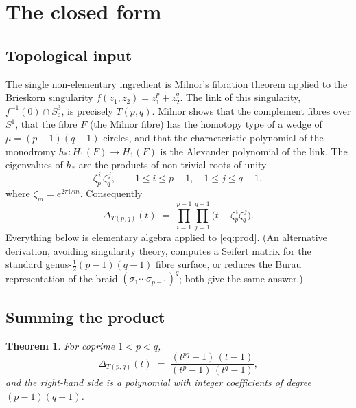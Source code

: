 \documentclass[11pt]{article}
\newtheorem{theorem}{Theorem}
\theoremstyle{definition}
\newcommand{\Deltaa}{\Delta}
\newcommand{\T}[2]{T(#1,#2)}
\begin{document}
\section{The closed form}

\subsection{Topological input}

The single non-elementary ingredient is Milnor's fibration theorem applied to the
Brieskorn singularity $f(z_{1},z_{2}) = z_{1}^{p} + z_{2}^{q}$. The link of this
singularity, $f^{-1}(0)\cap S^{3}_{\varepsilon}$, is precisely $\T{p}{q}$. Milnor
shows that the complement fibres over $S^{1}$, that the fibre $F$ (the Milnor fibre)
has the homotopy type of a wedge of $\mu = (p-1)(q-1)$ circles, and that the
characteristic polynomial of the monodromy $h_{*}\colon H_{1}(F) \to H_{1}(F)$ is the
Alexander polynomial of the link. The eigenvalues of $h_{*}$ are the products of
non-trivial roots of unity
\begin{equation}\label{eq:eigen}
\zeta_{p}^{\,i}\,\zeta_{q}^{\,j},
\qquad 1 \le i \le p-1,\quad 1 \le j \le q-1,
\end{equation}
where $\zeta_{m} = e^{2\pi \mathrm{i}/m}$. Consequently
\begin{equation}\label{eq:prod}
\Deltaa_{\T{p}{q}}(t)
\;=\;
\prod_{i=1}^{p-1}\prod_{j=1}^{q-1}\bigl(t - \zeta_{p}^{\,i}\zeta_{q}^{\,j}\bigr).
\end{equation}
Everything below is elementary algebra applied to \eqref{eq:prod}. (An alternative
derivation, avoiding singularity theory, computes a Seifert matrix for the standard
genus-$\tfrac{1}{2}(p-1)(q-1)$ fibre surface, or reduces the Burau representation of
the braid $(\sigma_{1}\cdots\sigma_{p-1})^{q}$; both give the same answer.)

\subsection{Summing the product}

\begin{theorem}\label{thm:closed}
For coprime $1<p<q$,
\[
\Deltaa_{\T{p}{q}}(t)
\;=\;
\frac{(t^{pq}-1)\,(t-1)}{(t^{p}-1)\,(t^{q}-1)} ,
\]
and the right-hand side is a polynomial with integer coefficients of degree $(p-1)(q-1)$.
\end{theorem}
\end{document}
